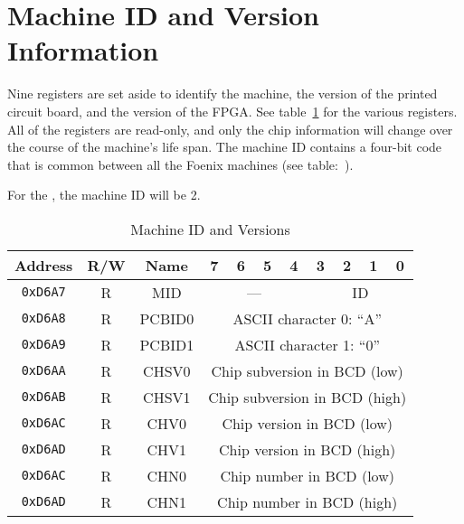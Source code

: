 \section{Machine ID and Version Information}

Nine registers are set aside to identify the machine, the version of the printed circuit board, and the version of the FPGA. See table~\ref{tab:machine_id_ver} for the various registers. All of the registers are read-only, and only the chip information will change over the course of the machine's life span. The machine ID contains a four-bit code that is common between all the Foenix machines (see table:~\label{tab:machine_ids}).

For the \jr, the machine ID will be 2.

\begin{table}[h]
    \begin{center}
        \begin{tabular}{|c|c|c|c|c|c|c|c|c|c|c|} \hline
            Address & R/W & Name & 7 & 6 & 5 & 4 & 3 & 2 & 1 & 0 \\\hline\hline
            \verb+0xD6A7+ & R & MID & \multicolumn{4}{|c|}{---} & \multicolumn{4}{|c|}{ID} \\ \hline

            \verb+0xD6A8+ & R & PCBID0 & \multicolumn{8}{|c|}{ASCII character 0: ``A''} \\ \hline
            \verb+0xD6A9+ & R & PCBID1 & \multicolumn{8}{|c|}{ASCII character 1: ``0''} \\ \hline

            \verb+0xD6AA+ & R & CHSV0 & \multicolumn{8}{|c|}{Chip subversion in BCD (low)} \\ \hline
            \verb+0xD6AB+ & R & CHSV1 & \multicolumn{8}{|c|}{Chip subversion in BCD (high)} \\ \hline
            \verb+0xD6AC+ & R & CHV0 & \multicolumn{8}{|c|}{Chip version in BCD (low)} \\ \hline
            \verb+0xD6AD+ & R & CHV1 & \multicolumn{8}{|c|}{Chip version in BCD (high)} \\ \hline
            \verb+0xD6AC+ & R & CHN0 & \multicolumn{8}{|c|}{Chip number in BCD (low)} \\ \hline
            \verb+0xD6AD+ & R & CHN1 & \multicolumn{8}{|c|}{Chip number in BCD (high)} \\ \hline
        \end{tabular}
    \end{center}
    \caption{Machine ID and Versions}
    \label{tab:machine_id_ver}
\end{table}

